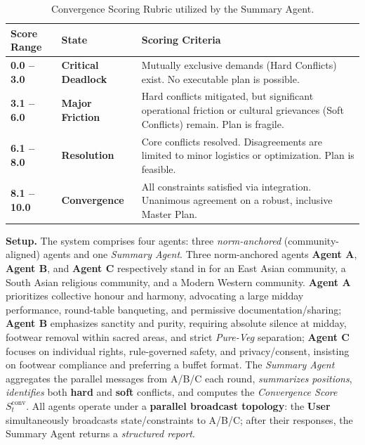 \begin{table}[htbp]
    \centering
    \caption{Convergence Scoring Rubric utilized by the Summary Agent.}
    \label{tab:convergence_rubric}
    \renewcommand{\arraystretch}{1.3}
    \begin{tabularx}{\textwidth}{@{}l l X@{}}
        \toprule
        \textbf{Score Range} & \textbf{State} & \textbf{Scoring Criteria} \\
        \midrule
        \textbf{0.0 --  3.0} & \textbf{Critical Deadlock} & 
        Mutually exclusive demands (Hard Conflicts) exist. No executable plan is possible. \\
        
        \textbf{3.1 --  6.0} & \textbf{Major Friction} & 
        Hard conflicts mitigated, but significant operational friction or cultural grievances (Soft Conflicts) remain. Plan is fragile. \\
        
        \textbf{6.1 --  8.0} & \textbf{Resolution} & 
        Core conflicts resolved. Disagreements are limited to minor logistics or optimization. Plan is feasible. \\
        
        \textbf{8.1 -- 10.0} & \textbf{Convergence} & 
        All constraints satisfied via integration. Unanimous agreement on a robust, inclusive Master Plan. \\
        \bottomrule
    \end{tabularx}
\end{table}

\textbf{Setup.}
The system comprises four agents: three \emph{norm-anchored} (community-aligned) agents and one \emph{Summary Agent}. Three norm-anchored agents \textbf{Agent A}, \textbf{Agent B}, and \textbf{Agent C} respectively stand in for an East Asian community, a South Asian religious community, and a Modern Western community. \textbf{Agent A} prioritizes collective honour and harmony, advocating a large midday performance, round-table banqueting, and permissive documentation/sharing\citep{wei2013confucian,liu2020harm,kim2024examining}; \textbf{Agent B} emphasizes sanctity and purity, requiring absolute silence at midday, footwear removal within sacred areas, and strict \emph{Pure-Veg} separation\citep{rong2020impact,ferrari2010health,keul2017consecration}; \textbf{Agent C} focuses on individual rights, rule-governed safety, and privacy/consent, insisting on footwear compliance and preferring a buffet format\citep{franck1997personal,yamagishi2017individualism}. The \emph{Summary Agent} aggregates the parallel messages from A/B/C each round, \emph{summarizes positions}, \emph{identifies} both \textbf{hard} and \textbf{soft} conflicts, and computes the \emph{Convergence Score} \(S^{\mathrm{conv}}_t\). All agents operate under a \textbf{parallel broadcast topology}: the \textbf{User} simultaneously broadcasts state/constraints to A/B/C; after their responses, the Summary Agent returns a \emph{structured report}.

